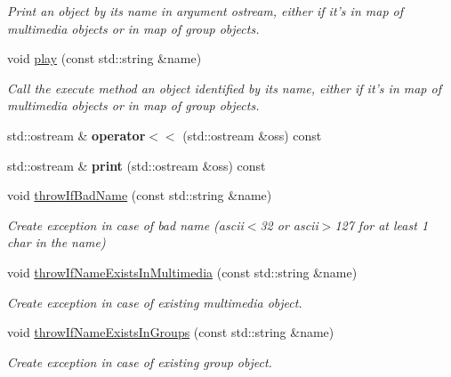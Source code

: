 \begin{DoxyCompactItemize}
\begin{DoxyCompactList}\small\item\em Print an object by its name in argument ostream, either if it's in map of multimedia objects or in map of group objects. \end{DoxyCompactList}\item 
\hypertarget{class_factory_ae08ccdd647ca3503d389f97dad8ad72d}{void \hyperlink{class_factory_ae08ccdd647ca3503d389f97dad8ad72d}{play} (const std\-::string \&name)}\label{class_factory_ae08ccdd647ca3503d389f97dad8ad72d}

\begin{DoxyCompactList}\small\item\em Call the execute method an object identified by its name, either if it's in map of multimedia objects or in map of group objects. \end{DoxyCompactList}\item 
\hypertarget{class_factory_ad520fe27ab831b5a1879ac5944ac457f}{std\-::ostream \& {\bfseries operator$<$$<$} (std\-::ostream \&oss) const }\label{class_factory_ad520fe27ab831b5a1879ac5944ac457f}

\item 
\hypertarget{class_factory_a2dc9d7912b475d5a1ff1a7655c762e5f}{std\-::ostream \& {\bfseries print} (std\-::ostream \&oss) const }\label{class_factory_a2dc9d7912b475d5a1ff1a7655c762e5f}

\item 
\hypertarget{class_factory_a6a83203ab543cb798a82bd95f774c9a3}{void \hyperlink{class_factory_a6a83203ab543cb798a82bd95f774c9a3}{throw\-If\-Bad\-Name} (const std\-::string \&name)}\label{class_factory_a6a83203ab543cb798a82bd95f774c9a3}

\begin{DoxyCompactList}\small\item\em Create exception in case of bad name (ascii$<$32 or ascii$>$127 for at least 1 char in the name) \end{DoxyCompactList}\item 
\hypertarget{class_factory_a83303191fff07dbf7f8ce4d532b2d901}{void \hyperlink{class_factory_a83303191fff07dbf7f8ce4d532b2d901}{throw\-If\-Name\-Exists\-In\-Multimedia} (const std\-::string \&name)}\label{class_factory_a83303191fff07dbf7f8ce4d532b2d901}

\begin{DoxyCompactList}\small\item\em Create exception in case of existing multimedia object. \end{DoxyCompactList}\item 
\hypertarget{class_factory_abdeccb8a1d76a56892347b01210a3388}{void \hyperlink{class_factory_abdeccb8a1d76a56892347b01210a3388}{throw\-If\-Name\-Exists\-In\-Groups} (const std\-::string \&name)}\label{class_factory_abdeccb8a1d76a56892347b01210a3388}

\begin{DoxyCompactList}\small\item\em Create exception in case of existing group object. \end{DoxyCompactList}\end{DoxyCompactItemize}


